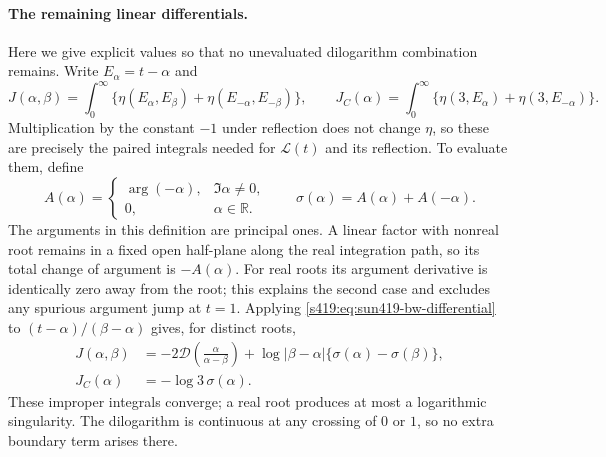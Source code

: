 \documentclass[11pt,a4paper]{article}
\theoremstyle{remark}\newtheorem{remark}[theorem]{Remark}
\numberwithin{equation}{section}
\begin{document}
\paragraph{The remaining linear differentials.}
Here we give explicit values so that no unevaluated dilogarithm
combination remains. Write $E_\alpha=t-\alpha$ and
\[
 J(\alpha,\beta)=\int_0^\infty
 \{\eta(E_\alpha,E_\beta)+\eta(E_{-\alpha},E_{-\beta})\},
 \qquad
 J_C(\alpha)=\int_0^\infty
 \{\eta(3,E_\alpha)+\eta(3,E_{-\alpha})\}.
\]
Multiplication by the constant $-1$ under reflection does not change
$\eta$, so these are precisely the paired integrals needed for
$\mathcal L(t)$ and its reflection.
To evaluate them, define
\[
 A(\alpha)=
 \begin{cases}\arg(-\alpha),&\Im\alpha\ne0,\\0,&\alpha\in\mathbb R.
 \end{cases}
 \qquad \sigma(\alpha)=A(\alpha)+A(-\alpha).
\]
The arguments in this definition are principal ones. A linear factor
with nonreal root remains in a fixed open half-plane along the real
integration path, so its total change of argument is $-A(\alpha)$.
For real roots its argument derivative is identically zero away from
the root; this explains the second case and excludes any spurious
argument jump at $t=1$.
Applying \eqref{s419:eq:sun419-bw-differential} to
$(t-\alpha)/(\beta-\alpha)$ gives, for distinct roots,
\begin{align}
 J(\alpha,\beta)
 &=-2\mathcal D\left(\frac{\alpha}{\alpha-\beta}\right)
 +\log|\beta-\alpha|\{\sigma(\alpha)-\sigma(\beta)\},
 \label{s419:eq:sun419-J}\\
 J_C(\alpha)&=-\log3\,\sigma(\alpha).
 \label{s419:eq:sun419-JC}
\end{align}
These improper integrals converge; a real root produces at most a
logarithmic singularity. The dilogarithm is continuous at any crossing
of $0$ or $1$, so no extra boundary term arises there.
\end{document}
